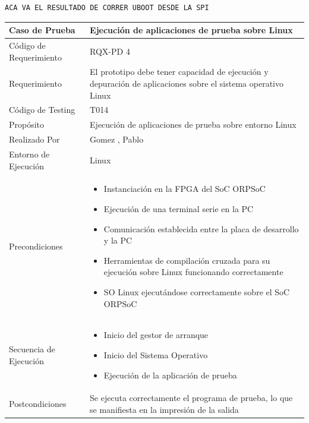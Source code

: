 \begin{lstlisting}[frame=single,caption={Salida de la secuencia de incio de Linux Embebido},label={lst:sallinux}]
 ACA VA EL RESULTADO DE CORRER UBOOT DESDE LA SPI
\end{lstlisting}		
		
		\begin{table}[h!]
		\centering
		\begin{tabular}{ p{5cm} p{10cm}  }
		\hline 
		\rowcolor[gray]{0.8} 	 Caso de Prueba & Ejecución de aplicaciones de prueba sobre Linux\\
		\hline  		Código de Requerimiento & RQX-PD 4\\ 
		\hline  				  Requerimiento & El prototipo debe tener capacidad de ejecución y depuración de aplicaciones sobre el sistema operativo Linux\\
		\hline 				  Código de Testing & T014\\ 
		\hline 						  Propósito & Ejecución de aplicaciones de prueba sobre entorno Linux\\
		\hline					  Realizado Por & Gomez , Pablo \\
		\hline	 		   Entorno de Ejecución & Linux\\
		\hline		   		   	 Precondiciones & \begin {itemize}
												  \item Instanciación en la FPGA del SoC ORPSoC
												  \item Ejecución de una terminal serie en la PC 
 												  \item Comunicación establecida entre la placa de desarrollo y la PC
 												  \item Herramientas de compilación cruzada para su ejecución sobre Linux funcionando correctamente
												  \item SO Linux ejecutándose correctamente sobre el SoC ORPSoC 
												  \end {itemize} \\
		\hline			 Secuencia de Ejecución & \begin {itemize}
						 					 	  \item Inicio del gestor de arranque
												  \item Inicio del Sistema Operativo
												  \item Ejecución de la aplicación de prueba
						 						  \end {itemize} \\
		\hline					Postcondiciones &  Se ejecuta correctamente el programa de prueba, lo que se manifiesta en la impresión de la salida

\end{tabular}
\end{table}
